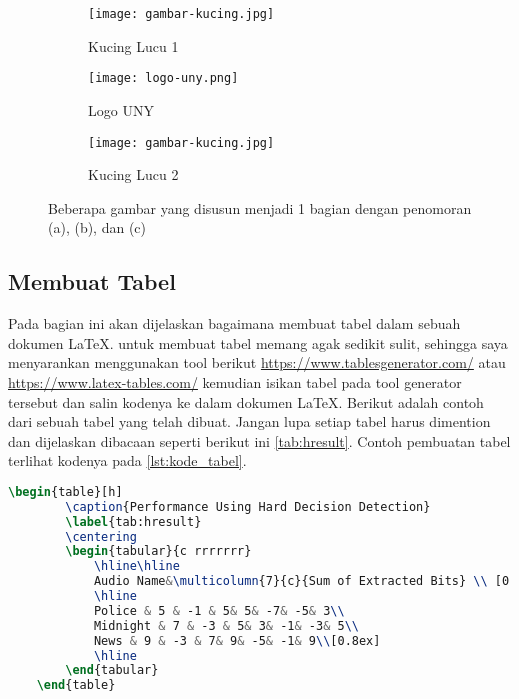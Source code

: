 \begin{figure}
    \centering
    \begin{subfigure}[b]{0.3\textwidth}
        \centering
        \texttt{[image: gambar-kucing.jpg]}
        \caption{Kucing Lucu 1}
        \label{fig:kucing-a}
    \end{subfigure}
    \hfill
    \begin{subfigure}[b]{0.3\textwidth}
        \centering
        \texttt{[image: logo-uny.png]}
        \caption{Logo UNY}
        \label{fig:logo-uny-b}
    \end{subfigure}
    \hfill
    \begin{subfigure}[b]{0.3\textwidth}
        \centering
        \texttt{[image: gambar-kucing.jpg]}
        \caption{Kucing Lucu 2}
        \label{fig:kucing-c}
    \end{subfigure}
    \caption{Beberapa gambar yang disusun menjadi 1 bagian dengan penomoran (a), (b), dan (c)}
    \label{fig:kucingdanUNY}
\end{figure}

\subsection{Membuat Tabel}
Pada bagian ini akan dijelaskan bagaimana membuat tabel dalam sebuah dokumen \LaTeX. untuk membuat tabel memang agak sedikit sulit, sehingga saya menyarankan menggunakan tool berikut \url{https://www.tablesgenerator.com/} atau \url{https://www.latex-tables.com/} kemudian isikan tabel pada tool generator tersebut dan salin kodenya ke dalam dokumen \LaTeX. Berikut adalah contoh dari sebuah tabel yang telah dibuat. Jangan lupa setiap tabel harus dimention dan dijelaskan dibacaan seperti berikut ini \cref{tab:hresult}. Contoh pembuatan tabel terlihat kodenya pada \cref{lst:kode_tabel}.

\begin{lstlisting}[language=TeX, caption=Kode untuk Membuat Tabel dalam Dokumen, label=lst:kode_tabel]
    \begin{table}[h]
        \caption{Performance Using Hard Decision Detection}
        \label{tab:hresult}
        \centering
        \begin{tabular}{c rrrrrrr}
            \hline\hline
            Audio Name&\multicolumn{7}{c}{Sum of Extracted Bits} \\ [0.5ex] 
            \hline
            Police & 5 & -1 & 5& 5& -7& -5& 3\\
            Midnight & 7 & -3 & 5& 3& -1& -3& 5\\
            News & 9 & -3 & 7& 9& -5& -1& 9\\[0.8ex]
            \hline
        \end{tabular}
    \end{table}
\end{lstlisting}

